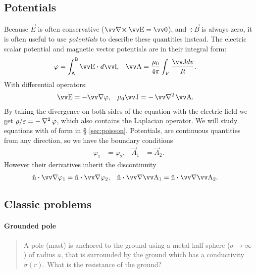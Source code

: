 \documentclass[margin=small]{tex/hsrzf}
\theoremstyle{elmagzf}
\begin{document}
\subsection{Potentials}

Because \(\vec{E}\) is often conservative (\(\curl \vec{E} = \vec{0}\)), and
\(\div \vec{B}\) is always zero, it is often useful to use \emph{potentials} to
describe these quantities instead. The electric scalar potential and magnetic
vector potentials are in their integral form:
\begin{align*}
  \varphi &= \int_\mathsf{A}^\mathsf{B} \vec{E} \dotp d\vec{l}, &
  \vec{A} &= \frac{\mu_0}{4\pi} \int_V \frac{\vec{J} dv}{R}.
\end{align*}
With differential operators:
\begin{align*}
  \vec{E} &= - \grad \varphi, &
  \mu_0 \vec{J} &= - \vlaplacian \vec{A}.
\end{align*}
By taking the divergence on both sides of the equation with the electric field
we get \(\rho/\varepsilon = - \operatorname{\nabla^2} \varphi\), which also contains the
Laplacian operator. We will study equations with of form in \S
\ref{sec:poisson}.  Potentials, are continuous quantities from any direction, so
we have the boundary conditions
\begin{align*}
  \varphi_1 &= \varphi_2, &
  \vec{A}_1 &= \vec{A}_2.
\end{align*}
However their derivatives inherit the discontinuity
\begin{align*}
  \uvec{n} \dotp \grad \varphi_1 &= \uvec{n} \dotp \grad \varphi_2, &
  \uvec{n} \dotp \grad \vec{A}_1 &= \uvec{n} \dotp \grad \vec{A}_2.
\end{align*}


\subsection{Classic problems}

\paragraph{Grounded pole}
\begin{quote}
  A pole (mast) is anchored to the ground using a metal half sphere (\(\sigma
  \to \infty\)) of radius \(a\), that is surrounded by the ground which has a
  conductivity \(\sigma(r)\). What is the resistance of the ground?
\end{quote}
\end{document}

